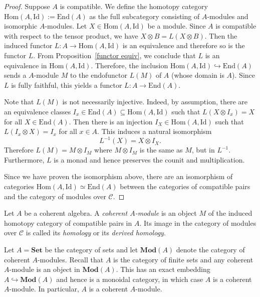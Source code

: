 \documentclass[a4paper,reqno,oneside]{article}
\begin{document}
\begin{proof}
    Suppose $A$ is compatible. We define the homotopy category $\mathrm{Hom}(A,\mathrm{Id}):=\mathrm{End}(A)$ as the full subcategory consisting of $A$-modules and isomorphic $A$-modules. Let $X \in \mathrm{Hom}(A,\mathrm{Id})$ be a module. Since $A$ is compatible with respect to the tensor product, we have $X \otimes B = L(X \otimes B)$. Then the induced functor $L:A \to \mathrm{Hom}(A,\mathrm{Id})$ is an equivalence and therefore so is the functor $L$. From Proposition~\ref{functor equiv}, we conclude that $L$ is an equivalence in $\mathrm{Hom}(A,\mathrm{Id})$. Therefore, the inclusion $\mathrm{Hom}(A,\mathrm{Id})\hookrightarrow \mathrm{End}(A)$ sends a $A$-module $M$ to the endofunctor $L(M)$ of $A$ (whose domain is $A$). Since $L$ is fully faithful, this yields a functor $L:A \to \mathrm{End}(A)$. 
    
    Note that $L(M)$ is not necessarily injective. Indeed, by assumption, there are an equivalence classes $I_{x} \in \mathrm{End}(A) \subseteq \mathrm{Hom}(A,\mathrm{Id})$ such that $L(X \otimes I_{x}) = X$ for all $X \in \mathrm{End}(A)$. Then there is an injection $I_X \in \mathrm{Hom}(A,\mathrm{Id})$ such that $L(I_{x} \otimes X) = I_{x}$ for all $x \in A$. This induces a natural isomorphism 
    \[ L^{-1}(X) = X \otimes I_X.\]
    Therefore $L(M) = M \otimes I_M$ where $M \otimes I_M$ is the same as $M$, but in $L^{-1}$. Furthermore, $L$ is a monad and hence preserves the counit and multiplication.
    
    Since we have proven the isomorphism above, there are an isomorphism of categories $\mathrm{Hom}(A,\mathrm{Id}) \simeq \mathrm{End}(A)$ between the categories of compatible pairs and the category of modules over $\mathcal{C}$.
\end{proof}

\begin{definition}\label{def module coherence}
    Let $A$ be a coherent algebra. A \textit{coherent $A$-module} is an object $M$ of the induced homotopy category of compatible pairs in $A$. Its image in the category of modules over $\mathcal{C}$ is called its \textit{homology} or its \textit{derived homology}.
\end{definition}

\begin{example}\label{ex modules over coherent algebras}
    Let $A = \mathbf{Set}$ be the category of sets and let $\mathbf{Mod}(A)$ denote the category of coherent $A$-modules. Recall that $A$ is the category of finite sets and any coherent $A$-module is an object in $\mathbf{Mod}(A)$. This has an exact embedding $A \hookrightarrow \mathbf{Mod}(A)$ and hence is a monoidal category, in which case $A$ is a coherent $A$-module. In particular, $A$ is a coherent $A$-module.
\end{example}
\end{document}
